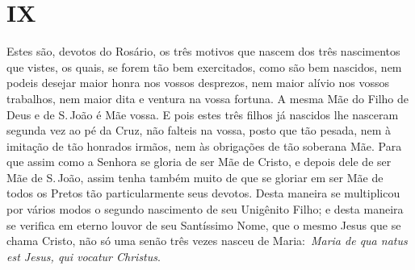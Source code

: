 \section*{IX}

Estes são, devotos do Rosário, os três motivos que nascem
dos três nascimentos que vistes, os quais, se forem tão bem exercitados,
como são bem nascidos, nem podeis desejar maior honra nos vossos
desprezos, nem maior alívio nos vossos trabalhos, nem maior dita e
ventura na vossa fortuna. A mesma Mãe do Filho de Deus e de S.\,João é
Mãe vossa. E pois estes três filhos já nascidos lhe nasceram segunda vez
ao pé da Cruz, não falteis na vossa, posto que tão pesada, nem à
imitação de tão honrados irmãos, nem às obrigações de tão soberana Mãe.
Para que assim como a Senhora se gloria de ser Mãe de Cristo, e depois
dele de ser Mãe de S.\,João, assim tenha também muito de que se gloriar
em ser Mãe de todos os Pretos tão particularmente seus devotos. Desta
maneira se multiplicou por vários modos o segundo nascimento de seu
Unigênito Filho; e desta maneira se verifica em eterno louvor de seu
Santíssimo Nome, que o mesmo Jesus que se chama Cristo, não só uma senão
três vezes nasceu de Maria:~\emph{Maria de qua natus est Jesus, qui
vocatur Christus}.


